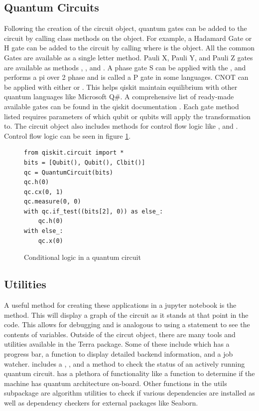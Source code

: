 \documentclass[conference]{IEEEtran}
\begin{document}
\subsection{Quantum Circuits}
Following the creation of the circuit object, quantum gates can be added to the circuit by calling class methods on the  object. 
For example, a Hadamard Gate or H gate can be added to the circuit by calling  where  is the  object. 
All the common Gates are available as a single letter method. 
Pauli X, Pauli Y, and Pauli Z gates are available as methods , , and .
A phase gate S can be applied with the , and performs a pi over 2 phase and is called a P gate in some languages.
CNOT can be applied with either  or . 
This helps qiskit maintain equilibrium with other quantum languages like Microsoft Q\#. 
A comprehensive list of ready-made available gates can be found in the qiskit documentation \cite{b6}.
Each gate method listed requires parameters of which qubit or qubits will apply the transformation to. 
The circuit object also includes methods for control flow logic like , and  \cite{b7}. Control flow logic can be seen in figure \ref{fig:conditional}.
\begin{figure}
    \centering
\begin{verbatim}
from qiskit.circuit import *
bits = [Qubit(), Qubit(), Clbit()]
qc = QuantumCircuit(bits)
qc.h(0)
qc.cx(0, 1)
qc.measure(0, 0)
with qc.if_test((bits[2], 0)) as else_:
    qc.h(0)
with else_:
    qc.x(0)
\end{verbatim}
    \caption{Conditional logic in a quantum circuit}
    \label{fig:conditional}
\end{figure}

\subsection{Utilities}
A useful method for creating these applications in a jupyter notebook is the  method.
This will display a graph of the circuit as it stands at that point in the code. 
This allows for debugging and is analogous to using a  statement to see the contents of variables. 
Outside of the circut object, there are many tools and utilities available in the Terra package. 
Some of these include  which has a progress bar, a function to display detailed backend information, and a job watcher. 
 includes a , , and a  method to check the status of an actively running quantum circuit. 
 has a plethora of functionality like a  function to determine if the machine has quantum architecture on-board. 
Other functions in the utils subpackage are algorithm utilities to check if various dependencies are installed as well as dependency checkers for external packages like Seaborn.
\end{document}
